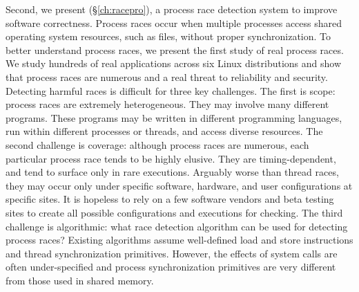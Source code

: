 Second, we present \racepro (\S\ref{ch:racepro}), a process race detection
system to improve software correctness. Process races occur when multiple
processes access shared operating system resources, such as files, without
proper synchronization.
To better understand process races, we present the first study of real process
races. We study hundreds of real applications across six Linux distributions and
show that process races are numerous and a real threat to reliability and
security. Detecting harmful races is difficult for three key challenges.
The first is scope: process races are extremely heterogeneous.  They may involve
many different programs.  These programs may be written in different programming
languages, run within different processes or threads, and access diverse
resources. The second challenge is coverage: although
process races are numerous, each particular process race tends to be highly
elusive.  They are timing-dependent, and tend to surface only in rare
executions. Arguably worse than thread races, they may occur only under
specific software, hardware, and user configurations at specific sites.  It is
hopeless to rely on a few software vendors and beta testing sites to create all
possible configurations and executions for checking.  The third challenge is
algorithmic: what race detection algorithm can be used for detecting process races?
Existing algorithms assume well-defined load and store instructions and thread
synchronization primitives. However, the effects of system calls are often
under-specified and process synchronization primitives are very different from
those used in shared memory.

